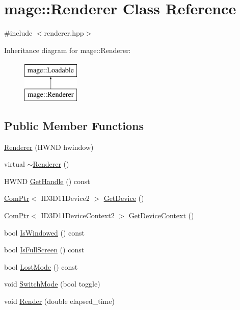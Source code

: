 \hypertarget{classmage_1_1_renderer}{}\section{mage\+:\+:Renderer Class Reference}
\label{classmage_1_1_renderer}


{\ttfamily \#include $<$renderer.\+hpp$>$}

Inheritance diagram for mage\+:\+:Renderer\+:\begin{figure}[H]
\begin{center}
\leavevmode
\includegraphics[height=2.000000cm]{classmage_1_1_renderer}
\end{center}
\end{figure}
\subsection*{Public Member Functions}
\begin{DoxyCompactItemize}
\item 
\hyperlink{classmage_1_1_renderer_a762dcda433c319af237d1dfd9bc6095f}{Renderer} (H\+W\+ND hwindow)
\item 
virtual \hyperlink{classmage_1_1_renderer_a997e041f28cc71d069d1ab7d29fe6ced}{$\sim$\+Renderer} ()
\item 
H\+W\+ND \hyperlink{classmage_1_1_renderer_a11d47495a47c58a0f67aae3110f9f519}{Get\+Handle} () const
\item 
\hyperlink{namespacemage_ae74f374780900893caa5555d1031fd79}{Com\+Ptr}$<$ I\+D3\+D11\+Device2 $>$ \hyperlink{classmage_1_1_renderer_a872e88f421405b06a995a6fb231d59ec}{Get\+Device} ()
\item 
\hyperlink{namespacemage_ae74f374780900893caa5555d1031fd79}{Com\+Ptr}$<$ I\+D3\+D11\+Device\+Context2 $>$ \hyperlink{classmage_1_1_renderer_a9c0c9254fb8295e415c80fff8de99f82}{Get\+Device\+Context} ()
\item 
bool \hyperlink{classmage_1_1_renderer_a1de1804c1eedae7dc12435a520a10b9c}{Is\+Windowed} () const
\item 
bool \hyperlink{classmage_1_1_renderer_a5ae3220e19c68f47a8e4d55e3ced4694}{Is\+Full\+Screen} () const
\item 
bool \hyperlink{classmage_1_1_renderer_afdde83a1e2bc9288f000fb2575c525d0}{Lost\+Mode} () const
\item 
void \hyperlink{classmage_1_1_renderer_a9004ab608659188900c808eacb5f873c}{Switch\+Mode} (bool toggle)
\item 
void \hyperlink{classmage_1_1_renderer_a95ac55eb4cc79a5712a50bfb78f67fe6}{Render} (double elapsed\+\_\+time)
\end{DoxyCompactItemize}
